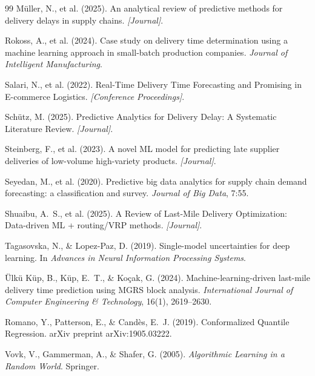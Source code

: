 \documentclass[12pt]{article}
\begin{document}
\begin{thebibliography}{99}
Müller, N., et al. (2025).
An analytical review of predictive methods for delivery delays in supply chains.
\emph{[Journal]}.

Rokoss, A., et al. (2024).
Case study on delivery time determination using a machine learning approach in small-batch production companies.
\emph{Journal of Intelligent Manufacturing}.

Salari, N., et al. (2022).
Real-Time Delivery Time Forecasting and Promising in E-commerce Logistics.
\emph{[Conference Proceedings]}.

Schütz, M. (2025).
Predictive Analytics for Delivery Delay: A Systematic Literature Review.
\emph{[Journal]}.

Steinberg, F., et al. (2023).
A novel ML model for predicting late supplier deliveries of low-volume high-variety products.
\emph{[Journal]}.

Seyedan, M., et al. (2020).
Predictive big data analytics for supply chain demand forecasting: a classification and survey.
\emph{Journal of Big Data}, 7:55.

Shuaibu, A.~S., et al. (2025).
A Review of Last-Mile Delivery Optimization: Data-driven ML + routing/VRP methods.
\emph{[Journal]}.

Tagasovska, N., \& Lopez-Paz, D. (2019).
Single-model uncertainties for deep learning.
In \emph{Advances in Neural Information Processing Systems}.

Ülkü Küp, B., Küp, E.~T., \& Koçak, G. (2024).
Machine-learning-driven last-mile delivery time prediction using MGRS block analysis.
\emph{International Journal of Computer Engineering \& Technology}, 16(1), 2619–2630.

Romano, Y., Patterson, E., \& Candès, E.~J. (2019).
Conformalized Quantile Regression.
arXiv preprint arXiv:1905.03222.

Vovk, V., Gammerman, A., \& Shafer, G. (2005).
\emph{Algorithmic Learning in a Random World}.
Springer.


\end{thebibliography}
\end{document}
